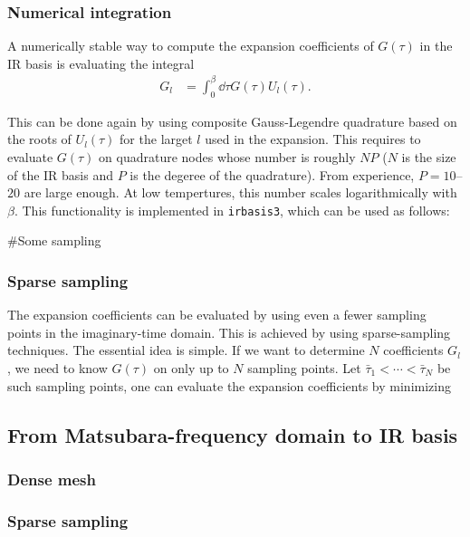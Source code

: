 \documentclass[submission, LectureNotes]{SciPost}
\begin{document}
\subsubsection{Numerical integration}
A numerically stable way to compute the expansion coefficients of $G(\tau)$ in the IR basis
is evaluating the integral
\begin{align}
    G_l &= \int_0^\beta \dd \tau G(\tau) U_l(\tau).
\end{align}

This can be done again by using composite Gauss-Legendre quadrature
based on the roots of $U_l(\tau)$ for the larget $l$ used in the expansion.
This requires to evaluate $G(\tau)$ on quadrature nodes whose number is roughly 
$N P$ ($N$ is the size of the IR basis and $P$ is the degeree of the quadrature).
From experience, $P=10$--$20$ are large enough.
At low tempertures,
this number scales logarithmically with $\beta$.
This functionality is implemented in \texttt{irbasis3}, which can be used as follows:
\begin{python}
#Some sampling
\end{python}

\subsubsection{Sparse sampling}
The expansion coefficients can be evaluated by using even a fewer sampling points in the imaginary-time domain.
This is achieved by using sparse-sampling techniques.
The essential idea is simple.
If we want to determine $N$ coefficients $G_l$,
we need to know $G(\tau)$ on only up to $N$ sampling points.
Let $\bar{\tau}_1 < \cdots < \bar{\tau}_N$ be such sampling points,
one can evaluate the expansion coefficients by minimizing



\subsection{From Matsubara-frequency domain to IR basis}
\subsubsection{Dense mesh}

\subsubsection{Sparse sampling}
\end{document}
